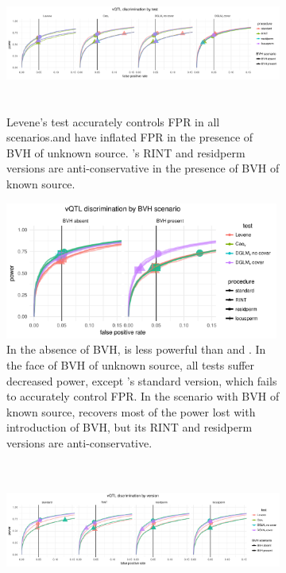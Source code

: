   \begin{figure}[ht]
      \begin{subfigure}{\textwidth}
          \centering
          \includegraphics[height = 4.5cm]{images/rocs_vqtl_all_facet_by_test.pdf}
          \caption{
          Levene's test accurately controls FPR in all scenarios.\Caov and \DGLMv have inflated FPR in the presence of BVH of unknown source.
          \DGLMv's RINT and residperm versions are anti-conservative in the presence of BVH of known source.}
      \vspace*{1cm}
      \end{subfigure}
      \begin{subfigure}{\textwidth}
          \centering
          \includegraphics[height = 4.5cm]{images/rocs_vqtl_all_facet_by_bvh.pdf}
          \caption{
          In the absence of BVH, \Lev is less powerful than \Caov and \DGLMv.
          In the face of BVH of unknown source, all tests suffer decreased power, except \DGLMv's standard version, which fails to accurately control FPR.
          In the scenario with BVH of known source, \DGLMv recovers most of the power lost with introduction of BVH, but its RINT and residperm versions are anti-conservative.
          }
      \vspace*{1cm}
      \end{subfigure}
      \begin{subfigure}{\textwidth}
          \centering
          \includegraphics[height = 4.5cm]{images/rocs_vqtl_all_facet_by_eval.pdf}

\end{subfigure}
\end{figure}
